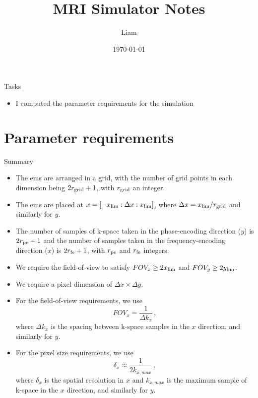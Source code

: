 \documentclass[dvipsnames]{beamer}
\title{MRI Simulator Notes}
\author{Liam}
\date{\today}
\begin{document}
\begin{frame}
\maketitle
\end{frame}

\begin{frame}{Tasks}
\begin{itemize}
\item I computed the parameter requirements for the simulation
\end{itemize}
\end{frame}

\section{Parameter requirements}

\begin{frame}{Summary}
\begin{itemize}
\item The ems are arranged in a grid, with the number of grid points in each dimension being $2r_{\rm grid}+1$, with $r_{\rm grid}$ an integer.
\item The ems are placed at $x = [-x_{\rm lim}: \Delta x: x_{\rm lim}]$, where $\Delta x = x_{\rm lim}/r_{\rm grid}$ and similarly for $y$.
\item The number of samples of k-space taken in the phase-encoding direction ($y$) is $2r_{\rm pe}+1$ and the number of samples taken in the frequency-encoding direction ($x$) is $2r_{\rm fe}+1$, with $r_{\rm pe}$ and $r_{\rm fe}$ integers.
\item We require the field-of-view to satisfy $FOV_x \geq 2x_{\rm lim}$ and $FOV_y \geq 2y_{\rm lim}$.
\item We require a pixel dimension of $\Delta x \times \Delta y$.
\end{itemize}
\end{frame}

\begin{frame}
\begin{itemize}
\item For the field-of-view requirements, we use
\begin{equation*}
FOV_x = \frac{1}{\Delta k_x}\,,
\end{equation*}
where $\Delta k_x$ is the spacing between k-space samples in the $x$ direction, and similarly for $y$.
\item For the pixel size requirements, we use
\begin{equation*}
\delta_x \approx \frac{1}{2k_{x,max}}\,,
\end{equation*}
where $\delta_x$ is the spatial resolution in $x$ and $k_{x,max}$ is the maximum sample of k-space in the $x$ direction, and similarly for $y$.
\end{itemize}
\end{frame}
\end{document}
